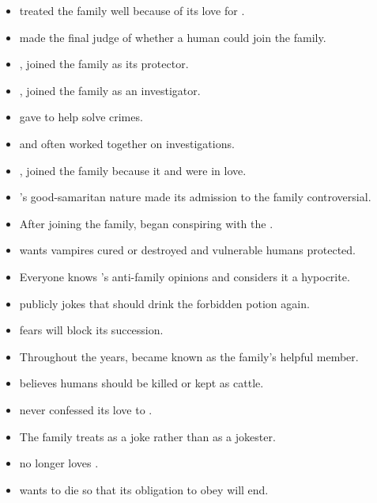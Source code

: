 \begin{itemize}
  \item {} treated the family well because of its love for .
  \item {} made  the final judge of whether a human could join the family.
  \item {},  joined the family as its protector.
  \item {},  joined the family as an investigator.
  \item {} gave   to help solve crimes.
  \item {} and  often worked together on investigations.
  \item {},  joined the family because it and  were in love.
  \item {}'s good-samaritan nature made its admission to the family controversial.
  \item After joining the family,  began conspiring with the .
  \item {} wants vampires cured or destroyed and vulnerable humans protected.
  \item Everyone knows 's anti-family opinions and considers it a hypocrite.
  \item {} publicly jokes that  should drink the forbidden potion again.
  \item {} fears  will block its succession.
  \item Throughout the years,  became known as the family's helpful member.
  \item {} believes humans should be killed or kept as cattle.
  \item {} never confessed its love to .
  \item The family treats  as a joke rather than as a jokester.
  \item {} no longer loves .
  \item {} wants  to die so that its obligation to obey will end.


\end{itemize}
